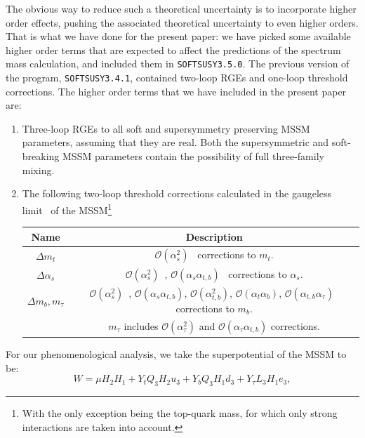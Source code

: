 \documentclass[final,3p,times,pdflatex]{elsarticle}
\begin{document}
The obvious way to reduce such a theoretical uncertainty is to incorporate
higher order effects, pushing the associated theoretical uncertainty to even
higher orders.
That is what we have done for the present paper: we have
picked some available higher order terms that are expected to affect the
predictions of the spectrum mass calculation, and included them in
{\tt SOFTSUSY3.5.0}. The previous version of the program, {\tt SOFTSUSY3.4.1}, 
contained two-loop RGEs and one-loop threshold corrections. 
The higher order terms that we have included in the present paper are: 
\begin{enumerate}
\item
Three-loop RGEs \cite{Jack:2004ch} to all soft and supersymmetry preserving
MSSM parameters,  
assuming that they are real. Both the supersymmetric and soft-breaking MSSM
parameters  
contain the possibility of full three-family mixing. 
\item
The following two-loop threshold
corrections calculated in the gaugeless limit~\cite{Haestier:2005ja} of the MSSM\footnote{With the only exception being the top-quark mass, for which only strong interactions are taken into account.}
\begin{center}
\begin{tabular}{|c|c|}\hline
Name & Description \\ \hline
$\Delta m_t$ & $\mathcal O(\alpha_s^2)$~\cite{Bednyakov:2002sf,Bednyakov:2005kt} corrections to $m_t$.  \\
$\Delta \alpha_s$ & $\mathcal O(\alpha_s^2)$~\cite{Harlander:2005wm,Bauer:2008bj}, $\mathcal O(\alpha_s \alpha_{t,b})$~\cite{Bednyakov:2010ni} corrections to $\alpha_s$. \\
$\Delta m_b, m_\tau$ & $\mathcal O(\alpha_s^2)$~\cite{Bauer:2008bj,Bednyakov:2007vm}, $\mathcal O(\alpha_s \alpha_{t,b})$, $\mathcal O(\alpha_{t,b}^2)$, $\mathcal O(\alpha_t \alpha_b)$, 
$\mathcal O(\alpha_{t,b} \alpha_\tau)$~\cite{Bednyakov:2009wt} corrections to $m_b$. \\ &
$m_\tau$ includes $\mathcal O(\alpha_\tau^2)$  and $\mathcal O(\alpha_\tau \alpha_{t,b})$ \cite{Bednyakov:2009wt} corrections. 
 \\
\hline \end{tabular}
\end{center}
\end{enumerate}
For our phenomenological analysis, we take the superpotential of the MSSM to be:
\begin{equation}
W=\mu H_2 H_1 + Y_t Q_3 H_2 u_3 + Y_b Q_3 H_1 d_3 + Y_\tau L_3 H_1 e_3,
\end{equation}
\end{document}
